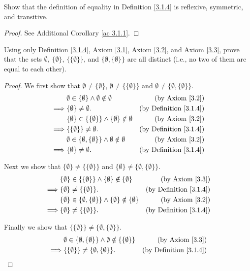 \exercisesection

\begin{exercise}\label{ex 3.1.1}
Show that the definition of equality in Definition \ref{3.1.4} is reflexive, symmetric, and transitive.
\end{exercise}

\begin{proof}
See Additional Corollary \ref{ac 3.1.1}.
\end{proof}

\begin{exercise}\label{ex 3.1.2}
Using only Definition \ref{3.1.4}, Axiom \ref{3.1}, Axiom \ref{3.2}, and Axiom \ref{3.3}, prove that the sets \(\emptyset\), \(\{\emptyset\}\), \(\{\{\emptyset\}\}\), and \(\{\emptyset, \{\emptyset\}\}\) are all distinct
(i.e., no two of them are equal to each other).
\end{exercise}

\begin{proof}
We first show that \(\emptyset \neq \{\emptyset\}\), \(\emptyset \neq \{\{\emptyset\}\}\) and \(\emptyset \neq \{\emptyset, \{\emptyset\}\}\).
\begin{align*}
& \emptyset \in \{\emptyset\} \land \emptyset \notin \emptyset & \text{(by Axiom \ref{3.2})} \\
\implies & \{\emptyset\} \neq \emptyset. & \text{(by Definition \ref{3.1.4})} \\
& \{\emptyset\} \in \{\{\emptyset\}\} \land \{\emptyset\} \notin \emptyset & \text{(by Axiom \ref{3.2})} \\
\implies & \{\{\emptyset\}\} \neq \emptyset. & \text{(by Definition \ref{3.1.4})} \\
& \emptyset \in \{\emptyset, \{\emptyset\}\} \land \emptyset \notin \emptyset & \text{(by Axiom \ref{3.2})} \\
\implies & \{\emptyset\} \neq \emptyset. & \text{(by Definition \ref{3.1.4})}
\end{align*}

Next we show that \(\{\emptyset\} \neq \{\{\emptyset\}\}\) and \(\{\emptyset\} \neq \{\emptyset, \{\emptyset\}\}\).
\begin{align*}
& \{\emptyset\} \in \{\{\emptyset\}\} \land \{\emptyset\} \notin \{\emptyset\} & \text{(by Axiom \ref{3.3})} \\
\implies & \{\emptyset\} \neq \{\{\emptyset\}\}. & \text{(by Definition \ref{3.1.4})} \\
& \{\emptyset\} \in \{\emptyset, \{\emptyset\}\} \land \{\emptyset\} \notin \{\emptyset\} & \text{(by Axiom \ref{3.2})} \\
\implies & \{\emptyset\} \neq \{\{\emptyset\}\}. & \text{(by Definition \ref{3.1.4})}
\end{align*}

Finally we show that \(\{\{\emptyset\}\} \neq \{\emptyset, \{\emptyset\}\}\).
\begin{align*}
& \emptyset \in \{\emptyset, \{\emptyset\}\} \land \emptyset \notin \{\{\emptyset\}\} & \text{(by Axiom \ref{3.3})} \\
\implies & \{\{\emptyset\}\} \neq \{\emptyset, \{\emptyset\}\}. & \text{(by Definition \ref{3.1.4})}
\end{align*}
\end{proof}


